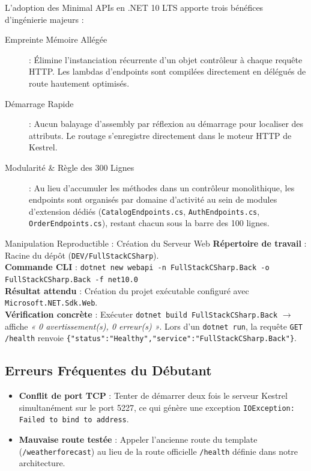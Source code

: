 L'adoption des Minimal APIs en .NET 10 LTS apporte trois bénéfices d'ingénierie majeurs :

\begin{description}
    \item[\color{secondary}Empreinte Mémoire Allégée] : Élimine l'instanciation récurrente d'un objet contrôleur à chaque requête HTTP. Les lambdas d'endpoints sont compilées directement en délégués de route hautement optimisés.
    \item[\color{cyanproj!90!black}Démarrage Rapide] : Aucun balayage d'assembly par réflexion au démarrage pour localiser des attributs. Le routage s'enregistre directement dans le moteur HTTP de Kestrel.
    \item[\color{accent}Modularité \& Règle des 300 Lignes] : Au lieu d'accumuler les méthodes dans un contrôleur monolithique, les endpoints sont organisés par domaine d'activité au sein de modules d'extension dédiés (\texttt{CatalogEndpoints.cs}, \texttt{AuthEndpoints.cs}, \texttt{OrderEndpoints.cs}), restant chacun sous la barre des 100 lignes.
\end{description}

\vspace{0.3cm}

\begin{bestpracticebox}{Manipulation Reproductible : Création du Serveur Web}
\textbf{Répertoire de travail} : Racine du dépôt (\texttt{DEV/FullStackCSharp}).\\[2pt]
\textbf{Commande CLI} : \texttt{dotnet new webapi -n FullStackCSharp.Back -o FullStackCSharp.Back -f net10.0}\\[2pt]
\textbf{Résultat attendu} : Création du projet exécutable configuré avec \texttt{Microsoft.NET.Sdk.Web}.\\[2pt]
\textbf{Vérification concrète} : Exécuter \texttt{dotnet build FullStackCSharp.Back} $\longrightarrow$ affiche \textit{« 0 avertissement(s), 0 erreur(s) »}. Lors d'un \texttt{dotnet run}, la requête \texttt{GET /health} renvoie \texttt{\{"status":"Healthy","service":"FullStackCSharp.Back"\}}.
\end{bestpracticebox}

\vspace{0.2cm}

\subsection*{Erreurs Fréquentes du Débutant}

\begin{itemize}
    \item \textbf{Conflit de port TCP} : Tenter de démarrer deux fois le serveur Kestrel simultanément sur le port 5227, ce qui génère une exception \texttt{IOException: Failed to bind to address}.
    \item \textbf{Mauvaise route testée} : Appeler l'ancienne route du template (\texttt{/weatherforecast}) au lieu de la route officielle \texttt{/health} définie dans notre architecture.
\end{itemize}

